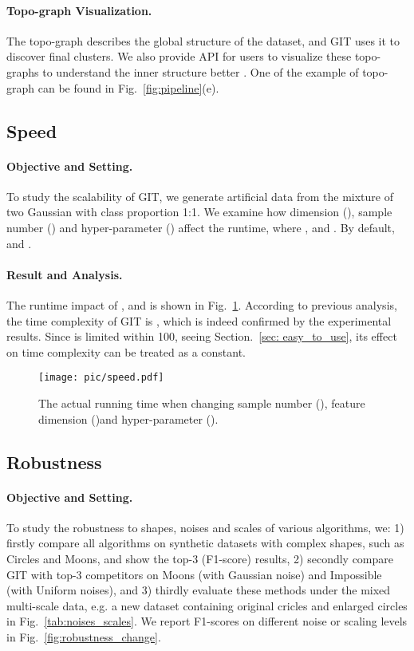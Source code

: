 \documentclass[letterpaper]{article} \usepackage{aaai22}  \usepackage{times}  \usepackage{helvet}  \usepackage{courier}  \usepackage[hyphens]{url}  \usepackage{graphicx} \urlstyle{rm} \def\UrlFont{\rm}  \usepackage{natbib}  \usepackage{caption} \DeclareCaptionStyle{ruled}{labelfont=normalfont,labelsep=colon,strut=off} \frenchspacing  \setlength{\pdfpagewidth}{8.5in}  \setlength{\pdfpageheight}{11in}  \usepackage{subfigure}
\begin{document}
\paragraph{Topo-graph Visualization.} The topo-graph describes the global structure of the dataset, and GIT uses it to discover final clusters. We also provide API for users to visualize these topo-graphs to understand the inner structure better \cite{d2021automatic}. One of the example of topo-graph can be found in Fig.~\ref{fig:pipeline}(e).


\subsection{Speed}
\paragraph{Objective and Setting.} 
To study the scalability of GIT, we generate artificial data from the mixture of two Gaussian with class proportion 1:1. We examine how dimension (), sample number () and hyper-parameter () affect the runtime, where ,  and . By default,  and .

\paragraph{Result and Analysis.} 
The runtime impact of , and  is shown in Fig.~\ref{fig:speed}. According to previous analysis, the time complexity of GIT is , which is indeed confirmed by the experimental results. Since  is limited within 100, seeing Section.~\ref{sec: easy_to_use}, its effect on time complexity can be treated as a constant.

\begin{figure}[H]
    \centering
    \texttt{[image: pic/speed.pdf]}
    \caption{ The actual running time when changing  sample number (), feature dimension ()and hyper-parameter ().  }
    \label{fig:speed}
\end{figure}

\subsection{Robustness}
\paragraph{Objective and Setting.} To study the robustness to shapes, noises and scales of various algorithms, we: 1) firstly compare all algorithms on synthetic datasets with complex shapes, such as Circles and Moons, and show the top-3 (F1-score) results, 2) secondly compare GIT with top-3 competitors on Moons (with Gaussian noise) and Impossible (with Uniform noises), and 3) thirdly evaluate these methods under the mixed multi-scale data, e.g. a new dataset containing original cricles and enlarged circles in Fig.~\ref{tab:noises_scales}. We report F1-scores on different noise or scaling levels in Fig.~\ref{fig:robustness_change}.
\end{document}
